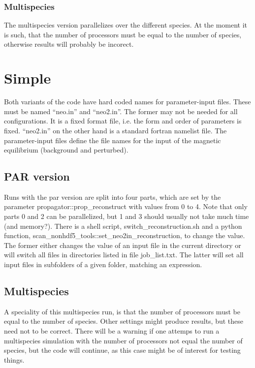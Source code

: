 \subsubsection{Multispecies}
The multispecies version parallelizes over the different species.
At the moment it is such, that the number of processors must be equal to
the number of species, otherwise results will probably be incorect.

\section{Simple}
Both variants of the code have hard coded names for parameter-input
files. These must be named ``neo.in'' and ``neo2.in''. The former may
not be needed for all configurations. It is a fixed format file, i.e.
the form and order of parameters is fixed. ``neo2.in'' on the other hand
is a standard fortran namelist file.
The parameter-input files define the file names for the input of the
magnetic equilibrium (background and perturbed).

\subsection{PAR version}
Runs with the par version are split into four parts, which are set by
the parameter propagator::prop\_reconstruct with values from 0 to 4.
Note that only parts 0 and 2 can be parallelized, but 1 and 3 should
usually not take much time (and memory?).
There is a shell script, switch\_reconstruction.sh and a python
function, scan\_nonhdf5\_tools::set\_neo2in\_reconstruction, to change the
value. The former either changes the value of an input file in the
current directory or will switch all files in directories listed in file
job\_list.txt. The latter will set all input files in subfolders of a
given folder, matching an expression.

\subsection{Multispecies}
A speciality of this multispecies run, is that the number of processors
must be equal to the number of species. Other settings might produce
results, but these need not to be correct.
There will be a warning if one attemps to run a multispecies simulation
with the number of processors not equal the number of species, but the
code will continue, as this case might be of interest for testing
things.

